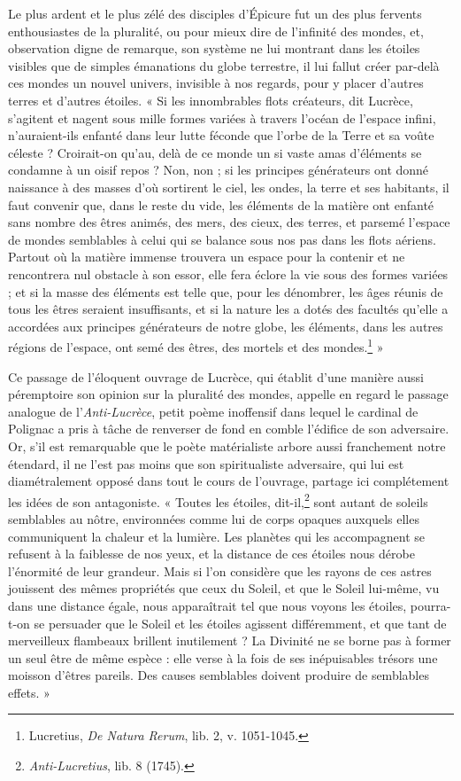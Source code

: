 \documentclass[a4paper, 11pt, oneside]{article}
\begin{document}
Le plus ardent et le plus zélé des disciples d'Épicure fut un des plus fervents enthousiastes de la pluralité, ou pour mieux dire de l'infinité des mondes, et, observation digne de remarque, son système ne lui montrant dans les étoiles visibles que de simples émanations du globe terrestre, il lui fallut créer par-delà ces mondes un nouvel univers, invisible à nos regards, pour y placer d'autres terres et d'autres étoiles. « Si les innombrables flots créateurs, dit Lucrèce, s'agitent et nagent sous mille formes variées à travers l'océan de l'espace infini, n'auraient-ils enfanté dans leur lutte féconde que l'orbe de la Terre et sa voûte céleste ? Croirait-on qu'au, delà de ce monde un si vaste amas d'éléments se condamne à un oisif repos ? Non, non ; si les principes générateurs ont donné naissance à des masses d'où sortirent le ciel, les ondes, la terre et ses habitants, il faut convenir que, dans le reste du vide, les éléments de la matière ont enfanté sans nombre des êtres animés, des mers, des cieux, des terres, et parsemé l'espace de mondes semblables à celui qui se balance sous nos pas dans les flots aériens. Partout où la matière immense trouvera un espace pour la contenir et ne rencontrera nul obstacle à son essor, elle fera éclore la vie sous des formes variées ; et si la masse des éléments est telle que, pour les dénombrer, les âges réunis de tous les êtres seraient insuffisants, et si la nature les a dotés des facultés qu'elle a accordées aux principes générateurs de notre globe, les éléments, dans les autres régions de l'espace, ont semé des êtres, des mortels et des mondes.\footnote{Lucretius, \emph{De Natura Rerum}, lib. 2, v. 1051-1045.} »

Ce passage de l'éloquent ouvrage de Lucrèce, qui établit d'une manière aussi péremptoire son opinion sur la pluralité des mondes, appelle en regard le passage analogue de l'\emph{Anti-Lucrèce}, petit poème inoffensif dans lequel le cardinal de Polignac a pris à tâche de renverser de fond en comble l'édifice de son adversaire. Or, s'il est remarquable que le poète matérialiste arbore aussi franchement notre étendard, il ne l'est pas moins que son spiritualiste adversaire, qui lui est diamétralement opposé dans tout le cours de l'ouvrage, partage ici complétement les idées de son antagoniste. « Toutes les étoiles, dit-il,\footnote{\emph{Anti-Lucretius}, lib. 8 (1745).} sont autant de soleils semblables au nôtre, environnées comme lui de corps opaques auxquels elles communiquent la chaleur et la lumière. Les planètes qui les accompagnent se refusent à la faiblesse de nos yeux, et la distance de ces étoiles nous dérobe l'énormité de leur grandeur. Mais si l'on considère que les rayons de ces astres jouissent des mêmes propriétés que ceux du Soleil, et que le Soleil lui-même, vu dans une distance égale, nous apparaîtrait tel que nous voyons les étoiles, pourra-t-on se persuader que le Soleil et les étoiles agissent différemment, et que tant de merveilleux flambeaux brillent inutilement ? La Divinité ne se borne pas à former un seul être de même espèce : elle verse à la fois de ses inépuisables trésors une moisson d'êtres pareils. Des causes semblables doivent produire de semblables effets. »
\end{document}
